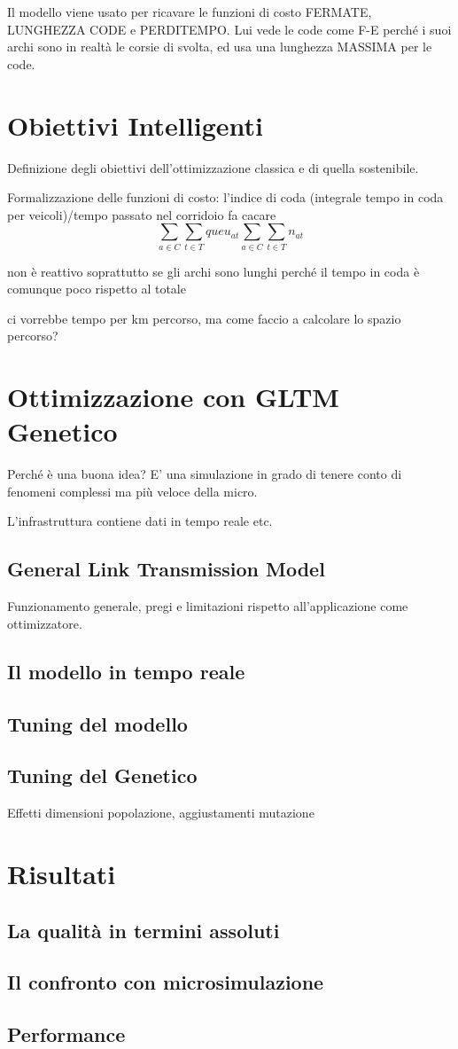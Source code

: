 \documentclass[10pt,a4paper,twoside]{book}
\begin{document}
Il modello viene usato per ricavare le funzioni di costo FERMATE, LUNGHEZZA CODE e PERDITEMPO.
Lui vede le code come F-E perché i suoi archi sono in realtà le corsie di svolta, ed usa una lunghezza MASSIMA per le code.



\chapter{Obiettivi Intelligenti}
Definizione degli obiettivi dell'ottimizzazione classica e di quella sostenibile.

Formalizzazione delle funzioni di costo:
l'indice di coda (integrale tempo in coda per veicoli)/tempo passato nel corridoio fa cacare
$$
\sum_{a \in C} \sum_{t \in T}{queu_{at}}{\sum_{a \in C} \sum_{t \in T}{n_{at}}}
$$

non è reattivo soprattutto se gli archi sono lunghi perché il tempo in coda è comunque poco rispetto al totale

ci vorrebbe tempo per km percorso, ma come faccio a calcolare lo spazio percorso?

\chapter{Ottimizzazione con GLTM Genetico}
Perché è una buona idea?
E' una simulazione in grado di tenere conto di fenomeni complessi ma più veloce della micro.

L'infrastruttura contiene dati in tempo reale etc.

\section{General Link Transmission Model}
Funzionamento generale, pregi e limitazioni rispetto all'applicazione come ottimizzatore.


\section{Il modello in tempo reale}

\section{Tuning del modello}


\section{Tuning del Genetico}
Effetti dimensioni popolazione, aggiustamenti mutazione

\chapter{Risultati}
\section{La qualità in termini assoluti}


\section{Il confronto con microsimulazione}


\section{Performance}
\end{document}

